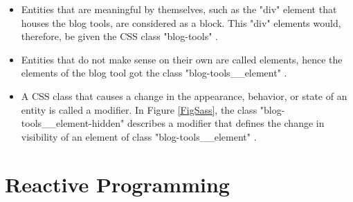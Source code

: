 \documentclass[Bachelor,BIF,english]{twbook}
\begin{document}
\begin{itemize}
\item Entities that are meaningful by themselves, such as the "div" element that houses the blog tools, are considered as a block. This "div" elements would, therefore, be given the CSS class "blog-tools" \cite{BEMNaming}.
\item Entities that do not make sense on their own are called elements, hence the elements of the blog tool got the class "blog-tools\_\_element" \cite{BEMNaming}.
\item A CSS class that causes a change in the appearance, behavior, or state of an entity is called a modifier. In Figure \ref{FigSass}, the class "blog-tools\_\_element-hidden" describes a modifier that defines the change in visibility of an element of class "blog-tools\_\_element" \cite{BEMNaming}.
\end{itemize}


\section{Reactive Programming}
\end{document}
